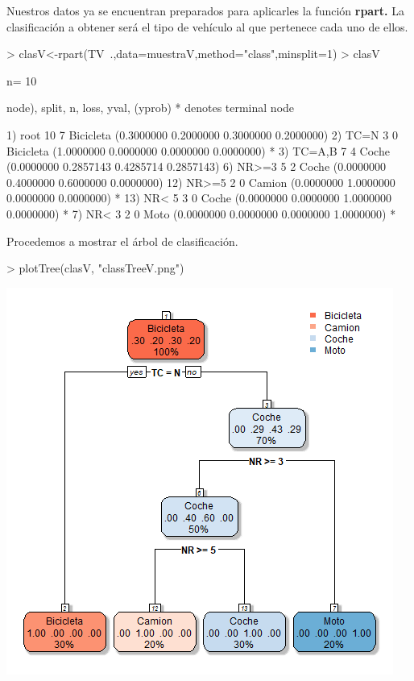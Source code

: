 \documentclass [a4paper] {article}
\begin{document}
\bigskip
Nuestros datos ya se encuentran preparados para aplicarles la función \textbf{rpart.} La clasificación a obtener será el tipo de
vehículo al que pertenece cada uno de ellos.
\begin{Schunk}
\begin{Sinput}
> clasV<-rpart(TV~.,data=muestraV,method="class",minsplit=1)
> clasV
\end{Sinput}
\begin{Soutput}
n= 10 

node), split, n, loss, yval, (yprob)
      * denotes terminal node

 1) root 10 7 Bicicleta (0.3000000 0.2000000 0.3000000 0.2000000)  
   2) TC=N 3 0 Bicicleta (1.0000000 0.0000000 0.0000000 0.0000000) *
   3) TC=A,B 7 4 Coche (0.0000000 0.2857143 0.4285714 0.2857143)  
     6) NR>=3 5 2 Coche (0.0000000 0.4000000 0.6000000 0.0000000)  
      12) NR>=5 2 0 Camion (0.0000000 1.0000000 0.0000000 0.0000000) *
      13) NR< 5 3 0 Coche (0.0000000 0.0000000 1.0000000 0.0000000) *
     7) NR< 3 2 0 Moto (0.0000000 0.0000000 0.0000000 1.0000000) *
\end{Soutput}
\end{Schunk}

\bigskip
Procedemos a mostrar el árbol de clasificación.
\begin{Schunk}
\begin{Sinput}
> plotTree(clasV, "classTreeV.png")
\end{Sinput}
\end{Schunk}
\includegraphics[width=\textwidth]{classTreeV}
\end{document}
